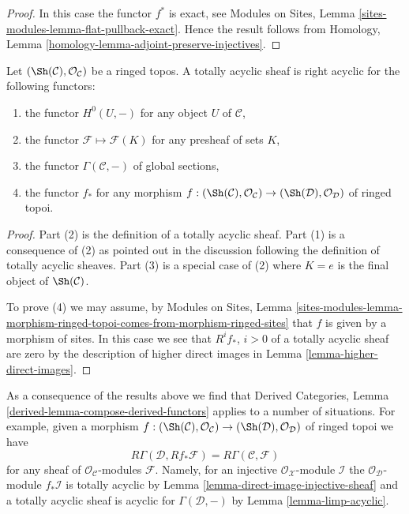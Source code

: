 \begin{proof}
In this case the functor $f^*$ is exact, see
Modules on Sites, Lemma \ref{sites-modules-lemma-flat-pullback-exact}.
Hence the result follows from
Homology, Lemma \ref{homology-lemma-adjoint-preserve-injectives}.
\end{proof}

\begin{lemma}
\label{lemma-limp-acyclic}
Let $(\Sh(\mathcal{C}), \mathcal{O}_\mathcal{C})$ be a ringed topos.
A totally acyclic sheaf is right acyclic for the following functors:
\begin{enumerate}
\item the functor $H^0(U, -)$ for any object $U$ of $\mathcal{C}$,
\item the functor $\mathcal{F} \mapsto \mathcal{F}(K)$ for any
presheaf of sets $K$,
\item the functor $\Gamma(\mathcal{C}, -)$ of global sections,
\item the functor $f_*$ for any morphism
$f : (\Sh(\mathcal{C}), \mathcal{O}_\mathcal{C}) \to
(\Sh(\mathcal{D}), \mathcal{O}_\mathcal{D})$ of ringed topoi.
\end{enumerate}
\end{lemma}

\begin{proof}
Part (2) is the definition of a totally acyclic sheaf.
Part (1) is a consequence of (2) as pointed out in the discussion following the
definition of totally acyclic sheaves.
Part (3) is a special case of (2) where $K = e$ is the final object
of $\Sh(\mathcal{C})$.

\medskip\noindent
To prove (4) we may assume, by
Modules on Sites, Lemma
\ref{sites-modules-lemma-morphism-ringed-topoi-comes-from-morphism-ringed-sites}
that $f$ is given by a morphism of sites. In this case we see that
$R^if_*$, $i > 0$ of a totally acyclic sheaf are zero by the description of
higher direct images in
Lemma \ref{lemma-higher-direct-images}.
\end{proof}

\begin{remark}
\label{remark-before-Leray}
As a consequence of the results above we find that
Derived Categories, Lemma \ref{derived-lemma-compose-derived-functors}
applies to a number of situations. For example, given a
morphism $f : (\Sh(\mathcal{C}), \mathcal{O}_\mathcal{C}) \to
(\Sh(\mathcal{D}), \mathcal{O}_\mathcal{D})$ of ringed topoi we have
$$
R\Gamma(\mathcal{D}, Rf_*\mathcal{F}) = R\Gamma(\mathcal{C}, \mathcal{F})
$$
for any sheaf of $\mathcal{O}_\mathcal{C}$-modules $\mathcal{F}$.
Namely, for an injective $\mathcal{O}_\mathcal{X}$-module $\mathcal{I}$
the $\mathcal{O}_\mathcal{D}$-module $f_*\mathcal{I}$ is totally acyclic by
Lemma \ref{lemma-direct-image-injective-sheaf}
and a totally acyclic sheaf is acyclic for $\Gamma(\mathcal{D}, -)$ by
Lemma \ref{lemma-limp-acyclic}.
\end{remark}

